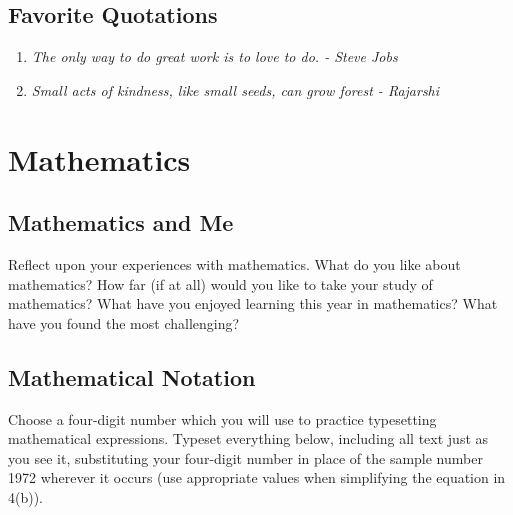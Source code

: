 \documentclass[a4paper,14pt]{article}
\begin{document}
\subsection{Favorite Quotations}
\begin{enumerate}
    \item \textit{The only way to do great work is to love to do. - Steve Jobs}
    \item \textit{Small acts of kindness, like small seeds, can grow forest - Rajarshi }
\end{enumerate}
\section{Mathematics}

\subsection{Mathematics and Me}
Reflect upon your experiences with mathematics. What do you like about mathematics? How far (if at all) would you like to take your study of mathematics? What have you enjoyed learning this year in mathematics? What have you found the most challenging?

\subsection{Mathematical Notation}
Choose a four-digit number which you will use to practice typesetting mathematical expressions. Typeset everything below, including all text just as you see it, substituting your four-digit number in place of the sample number 1972 wherever it occurs (use appropriate values when simplifying the equation in 4(b)).
\end{document}
